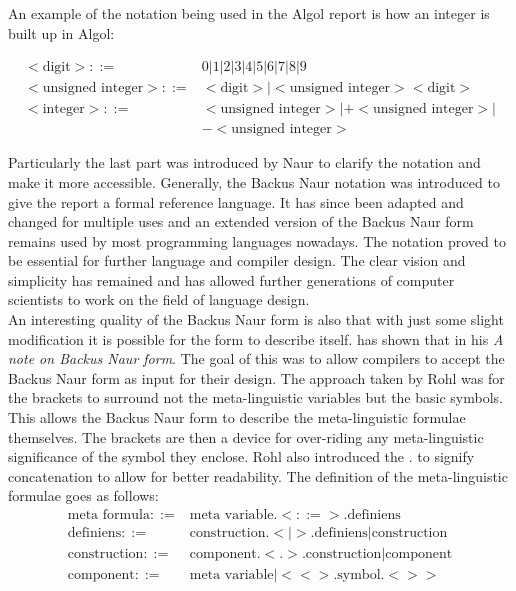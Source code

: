 \documentclass{article}
\begin{document}
An example of the notation being used in the Algol report is how an integer is built up in Algol:

\begin{equation} \label{eq2}
	\begin{split}
	<\text{digit}> ::=&0|1|2|3|4|5|6|7|8|9 \\
	<\text{unsigned integer}> ::=&<\text{digit}>|<\text{unsigned integer}><\text{digit}> \\
	<\text{integer}> ::=&<\text{unsigned integer}>|+<\text{unsigned integer}>|\\&-<\text{unsigned integer}>
	\end{split}
\end{equation}

Particularly the last part was introduced by Naur to clarify the notation and make it more accessible. Generally, the Backus Naur notation was introduced to give the report a formal reference language. It has since been adapted and changed for multiple uses and an extended version of the Backus Naur form remains used by most programming languages nowadays. The notation proved to be essential for further language and compiler design. The clear vision and simplicity has remained and has allowed further generations of computer scientists to work on the field of language design.
\\
An interesting quality of the Backus Naur form is also that with just some slight modification it is possible for the form to describe itself. \citet{rohl1968note} has shown that in his \textit{A note on Backus Naur form}. The goal of this was to allow compilers to accept the Backus Naur form as input for their design. The approach taken by Rohl was for the brackets to surround not the meta-linguistic variables but the basic symbols. This allows the Backus Naur form to describe the meta-linguistic formulae themselves. The brackets are then a device for over-riding any meta-linguistic significance of the symbol they enclose. Rohl also introduced the $.$ to signify concatenation to allow for better readability.
The definition of the meta-linguistic formulae goes as follows:
\begin{equation} \label{eq2}
\begin{split}
	\text{meta formula} ::=& \text{meta variable}.<::=>.\text{definiens} \\
	\text{definiens} ::=& \text{construction}.<|>.\text{definiens} | \text{construction} \\
	\text{construction} ::=& \text{component}.<.>.\text{construction} | \text{component} \\
	\text{component} ::=& \text{meta variable} | <<>.\text{symbol}.<>> \\
\end{split}
\end{equation}
\end{document}

